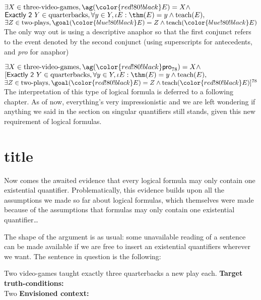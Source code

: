 \ex
$\exists X\in \text{three-video-games}, \ag({\color{red!80!black}E}) = X \wedge $\\
$\textsf{Exactly 2 } Y\in \text{quarterbacks}, \forall y \in Y, \iota E: \thm(E) = y \wedge \text{teach}(E),$\\
$\exists Z\in \text{two-plays}, \goal({\color{blue!80!black} E}) = Z \wedge \text{teach}({\color{blue!80!black} E})$\\
\xe
%
The only way out is using a descriptive anaphor so that the first conjunct refers to the event denoted by the second conjunct (using superscripts for antecedents, and \emph{pro} for anaphor)

\ex
$\exists X\in \text{three-video-games}, \ag({\color{red!80!black}\textsf{pro}_{78}}) = X \wedge $\\
$[\textsf{Exactly 2 } Y\in \text{quarterbacks}, \forall y \in Y, \iota E: \thm(E) = y \wedge \text{teach}(E),$\\
$\exists Z\in \text{two-plays}, \goal({\color{red!80!black} E}) = Z \wedge \text{teach}({\color{red!80!black} E})]^{78}$\\
\xe
%
The interpretation of this type of logical formula is deferred to a following chapter. As of now, everything's very impressionistic and we are left wondering if anything we said in the section on singular quantifiers still stands, given this new requirement of logical formulas.

\section{title}

Now comes the awaited evidence that every logical formula may only contain one existential quantifier. Problematically, this evidence builds upon all the assumptions we made so far about logical formulas, which themselves were made because of the assumptions that formulas may only contain one existential quantifier\ldots

The shape of the argument is as usual: some unavailable reading of a sentence can be made available if we are free to insert an existential quantifiers wherever we want. The sentence in question is the following:

\pex
\a 
Two video-games taught exactly three quarterbacks a new play each.
\a 
\textbf{Target truth-conditions:}\\
Two 
\a 
\textbf{Envisioned context:}\\

\xe
%



